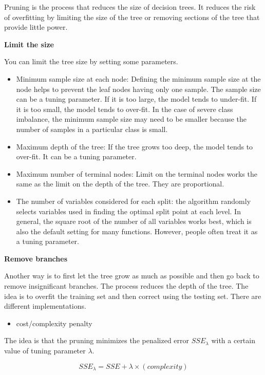 \documentclass[12pt,]{krantz}
\providecommand{\tightlist}{%
  \setlength{\itemsep}{0pt}\setlength{\parskip}{0pt}}
\begin{document}
Pruning is the process that reduces the size of decision trees. It reduces the risk of overfitting by limiting the size of the tree or removing sections of the tree that provide little power.

\textbf{Limit the size}

You can limit the tree size by setting some parameters.

\begin{itemize}
\item
  Minimum sample size at each node: Defining the minimum sample size at the node helps to prevent the leaf nodes having only one sample. The sample size can be a tuning parameter. If it is too large, the model tends to under-fit. If it is too small, the model tends to over-fit. In the case of severe class imbalance, the minimum sample size may need to be smaller because the number of samples in a particular class is small.
\item
  Maximum depth of the tree: If the tree grows too deep, the model tends to over-fit. It can be a tuning parameter.
\item
  Maximum number of terminal nodes: Limit on the terminal nodes works the same as the limit on the depth of the tree. They are proportional.
\item
  The number of variables considered for each split: the algorithm randomly selects variables used in finding the optimal split point at each level. In general, the square root of the number of all variables works best, which is also the default setting for many functions. However, people often treat it as a tuning parameter.
\end{itemize}

\textbf{Remove branches}

Another way is to first let the tree grow as much as possible and then go back to remove insignificant branches. The process reduces the depth of the tree. The idea is to overfit the training set and then correct using the testing set. There are different implementations.

\begin{itemize}
\tightlist
\item
  cost/complexity penalty
\end{itemize}

The idea is that the pruning minimizes the penalized error \(SSE_{\lambda}\) with a certain value of tuning parameter \(\lambda\).

\[SSE_{\lambda} = SSE+\lambda \times (complexity)\]
\end{document}
